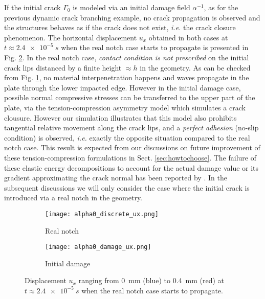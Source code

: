If the initial crack $\Gamma_0$ is modeled via an initial damage field $\alpha^{-1}$, as for the previous dynamic crack branching example, no crack propagation is observed and the structures behaves as if the crack does not exist, \emph{i.e.} the crack closure phenomenon. The horizontal displacement $u_x$ obtained in both cases at $t\approx\SI{2.4e-5}{s}$ when the real notch case starts to propagate is presented in Fig. \ref{fig:alpha0}. In the real notch case, \emph{contact condition is not prescribed} on the initial crack lips distanced by a finite height $\approx h$ in the geometry. As can be checked from Fig. \ref{fig:discretecase}, no material interpenetration happens and waves propagate in the plate through the lower impacted edge. However in the initial damage case, possible normal compressive stresses can be transferred to the upper part of the plate, via the tension-compression asymmetry model \cite{FreddiRoyer-Carfagni:2010} which simulates a crack clousure. However our simulation illustrates that this model also prohibits tangential relative movement along the crack lips, and a \emph{perfect adhesion} (no-slip condition) is observed, \emph{i.e.} exactly the opposite situation compared to the real notch case. This result is expected from our discussions on future improvement of these tension-compression formulations in Sect. \ref{sec:howtochoose}. The failure of these elastic energy decompositions to account for the actual damage value or its gradient approximating the crack normal has been reported by \cite{MayVignolletBorst:2015,StroblSeelig:2015}. In the subsequent discussions we will only consider the case where the initial crack is introduced via a real notch in the geometry.
\begin{figure}[htbp]
\centering
\begin{subfigure}[b]{0.48\textwidth}
\centering
\texttt{[image: alpha0\_discrete\_ux.png]}
\caption{Real notch} \label{fig:discretecase}
\end{subfigure}
\begin{subfigure}[b]{0.48\textwidth}
\centering
\texttt{[image: alpha0\_damage\_ux.png]}
\caption{Initial damage}
\end{subfigure}
\caption{Displacement $u_x$ ranging from \SI{0}{mm} (blue) to \SI{0.4}{mm} (red) at $t\approx\SI{2.4e-5}{s}$ when the real notch case starts to propagate.} \label{fig:alpha0}
\end{figure}


